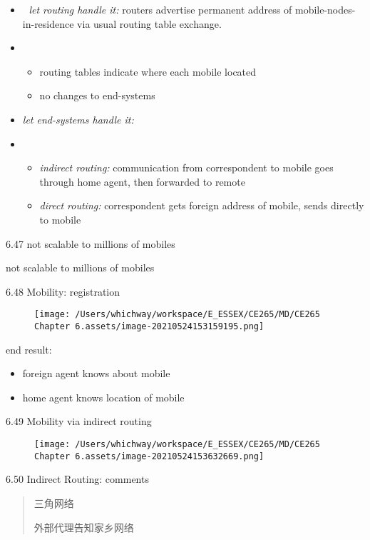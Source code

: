 \documentclass[
]{article}
\begin{document}
\begin{itemize}
\item
  🚫 \emph{let routing handle it:} routers advertise permanent address of
  mobile-nodes-in-residence via usual routing table exchange.
\item
  \begin{itemize}
  \item
    routing tables indicate where each mobile located
  \item
    no changes to end-systems
  \end{itemize}
\item
  \emph{let end-systems handle it:}
\item
  \begin{itemize}
  \item
    \emph{indirect routing:} communication from correspondent to mobile
    goes through home agent, then forwarded to remote
  \item
    \emph{direct routing:} correspondent gets foreign address of mobile,
    sends directly to mobile
  \end{itemize}
\end{itemize}

6.47 not scalable to millions of mobiles

not scalable to millions of mobiles

6.48 Mobility: registration

\begin{figure}
\centering
\texttt{[image: /Users/whichway/workspace/E\_ESSEX/CE265/MD/CE265 Chapter 6.assets/image-20210524153159195.png]}
\caption{}
\end{figure}

end result:

\begin{itemize}
\item
  foreign agent knows about mobile
\item
  home agent knows location of mobile
\end{itemize}

6.49 Mobility via indirect routing

\begin{figure}
\centering
\texttt{[image: /Users/whichway/workspace/E\_ESSEX/CE265/MD/CE265 Chapter 6.assets/image-20210524153632669.png]}
\caption{}
\end{figure}

6.50 Indirect Routing: comments

\begin{quote}
三角网络

外部代理告知家乡网络
\end{quote}
\end{document}
